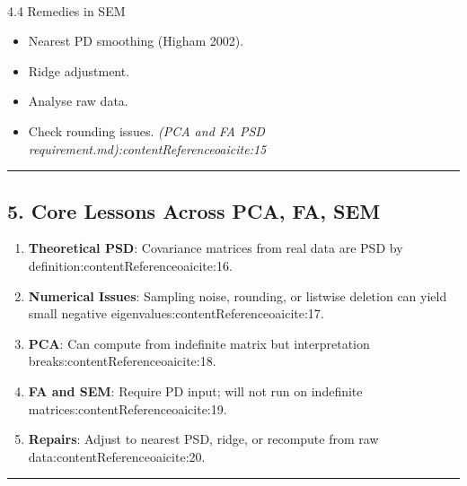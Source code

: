\documentclass[
  letterpaper,
  DIV=11,
  numbers=noendperiod]{scrartcl}
\makeatletter
\let\oldparagraph\paragraph
\renewcommand{\paragraph}{
    \@ifstar
      \xxxParagraphStar
      \xxxParagraphNoStar
  }
\newcommand{\xxxParagraphStar}[1]{\oldparagraph*{#1}\mbox{}}
\newcommand{\xxxParagraphNoStar}[1]{\oldparagraph{#1}\mbox{}}
\providecommand{\tightlist}{%
  \setlength{\itemsep}{0pt}\setlength{\parskip}{0pt}}
\theoremstyle{remark}
\makeatother
\begin{document}
\paragraph{4.4 Remedies in SEM}\label{remedies-in-sem}

\begin{itemize}
\tightlist
\item
  Nearest PD smoothing (Higham 2002).
\item
  Ridge adjustment.
\item
  Analyse raw data.
\item
  Check rounding issues. \emph{(PCA and FA PSD
  requirement.md):contentReference{oaicite:15}}
\end{itemize}

\begin{center}\rule{0.5\linewidth}{0.5pt}\end{center}

\subsection{5. Core Lessons Across PCA, FA,
SEM}\label{core-lessons-across-pca-fa-sem}

\begin{enumerate}
\def\labelenumi{\arabic{enumi}.}
\tightlist
\item
  \textbf{Theoretical PSD}: Covariance matrices from real data are PSD
  by definition:contentReference{oaicite:16}.
\item
  \textbf{Numerical Issues}: Sampling noise, rounding, or listwise
  deletion can yield small negative
  eigenvalues:contentReference{oaicite:17}.
\item
  \textbf{PCA}: Can compute from indefinite matrix but interpretation
  breaks:contentReference{oaicite:18}.
\item
  \textbf{FA and SEM}: Require PD input; will not run on indefinite
  matrices:contentReference{oaicite:19}.
\item
  \textbf{Repairs}: Adjust to nearest PSD, ridge, or recompute from raw
  data:contentReference{oaicite:20}.
\end{enumerate}

\begin{center}\rule{0.5\linewidth}{0.5pt}\end{center}
\end{document}
